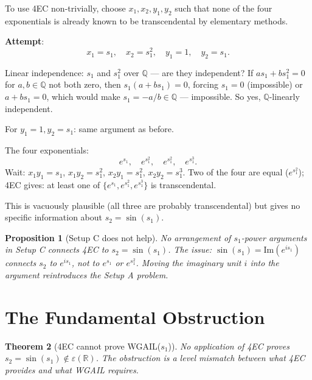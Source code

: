 \documentclass[11pt]{article}
\newtheorem{theorem}{Theorem}
\newtheorem{proposition}[theorem]{Proposition}
\begin{document}
To use 4EC non-trivially, choose $x_1, x_2, y_1, y_2$ such that none of the
four exponentials is already known to be transcendental by elementary methods.

\textbf{Attempt}:
\[
x_1 = s_1,\quad x_2 = s_1^2,\quad y_1 = 1,\quad y_2 = s_1.
\]

Linear independence: $s_1$ and $s_1^2$ over $\mathbb{Q}$ — are they independent?
If $a s_1 + b s_1^2 = 0$ for $a, b \in \mathbb{Q}$ not both zero, then
$s_1(a + b s_1) = 0$, forcing $s_1 = 0$ (impossible) or $a + b s_1 = 0$,
which would make $s_1 = -a/b \in \mathbb{Q}$ — impossible. So yes, $\mathbb{Q}$-linearly independent.

For $y_1 = 1, y_2 = s_1$: same argument as before.

The four exponentials:
\[
e^{s_1},\quad e^{s_1^2},\quad e^{s_1^2},\quad e^{s_1^3}.
\]
Wait: $x_1 y_1 = s_1$, $x_1 y_2 = s_1^2$, $x_2 y_1 = s_1^2$, $x_2 y_2 = s_1^3$.
Two of the four are equal ($e^{s_1^2}$); 4EC gives: at least one of $\{e^{s_1}, e^{s_1^2}, e^{s_1^3}\}$ is transcendental.

This is vacuously plausible (all three are probably transcendental) but gives
no specific information about $s_2 = \sin(s_1)$.

\begin{proposition}[Setup C does not help]
No arrangement of $s_1$-power arguments in Setup C connects 4EC to $s_2 = \sin(s_1)$.
The issue: $\sin(s_1) = \mathrm{Im}(e^{is_1})$ connects $s_2$ to $e^{is_1}$,
not to $e^{s_1}$ or $e^{s_1^2}$. Moving the imaginary unit $i$ into the argument
reintroduces the Setup A problem.
\end{proposition}

\section{The Fundamental Obstruction}

\begin{theorem}[4EC cannot prove WGAIL($s_1$)]
\label{thm:obstruction}
No application of 4EC proves $s_2 = \sin(s_1) \notin \varepsilon(\mathbb{R})$.
The obstruction is a level mismatch between what 4EC provides and what WGAIL requires.
\end{theorem}
\end{document}
